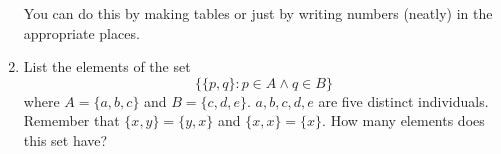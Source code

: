 \documentclass[12pt]{article}
\begin{document}
\begin{enumerate}
You can do this by making tables or just by writing numbers (neatly) in the appropriate places.

\newpage

\item  List the elements of the set $$\{\{p,q\}:p \in A \wedge q \in B\}$$  where $A = \{a,b,c\}$ and $B = \{c,d,e\}$.  $a,b,c,d,e$ are five distinct individuals.  Remember that $\{x,y\} = \{y,x\}$ and $\{x,x\}=\{x\}$.  How many elements does this set have?


\newpage

\end{enumerate}
\end{document}
